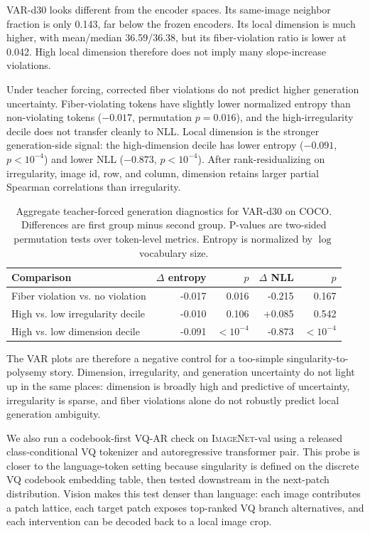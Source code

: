 \documentclass{article}
\newcommand{\dataset}[1]{\textsc{#1}}
\begin{document}
VAR-d30 looks different from the encoder spaces. Its same-image neighbor fraction is only 0.143, far below the frozen encoders. Its local dimension is much higher, with mean/median 36.59/36.38, but its fiber-violation ratio is lower at 0.042. High local dimension therefore does not imply many slope-increase violations.

Under teacher forcing, corrected fiber violations do not predict higher generation uncertainty. Fiber-violating tokens have slightly lower normalized entropy than non-violating tokens ($-0.017$, permutation $p=0.016$), and the high-irregularity decile does not transfer cleanly to NLL. Local dimension is the stronger generation-side signal: the high-dimension decile has lower entropy ($-0.091$, $p<10^{-4}$) and lower NLL ($-0.873$, $p<10^{-4}$). After rank-residualizing on irregularity, image id, row, and column, dimension retains larger partial Spearman correlations than irregularity.

\begin{table}[H]
\centering
\scriptsize
\caption{Aggregate teacher-forced generation diagnostics for VAR-d30 on \dataset{COCO}. Differences are first group minus second group. P-values are two-sided permutation tests over token-level metrics. Entropy is normalized by $\log$ vocabulary size.}
\begin{tabular}{@{}lrrrr@{}}
\toprule
Comparison & $\Delta$ entropy & $p$ & $\Delta$ NLL & $p$ \\
\midrule
Fiber violation vs. no violation & -0.017 & 0.016 & -0.215 & 0.167 \\
High vs. low irregularity decile & -0.010 & 0.106 & +0.085 & 0.542 \\
High vs. low dimension decile & -0.091 & $<10^{-4}$ & -0.873 & $<10^{-4}$ \\
\bottomrule
\end{tabular}
\label{tab:coco-var-generation}
\end{table}

The VAR plots are therefore a negative control for a too-simple singularity-to-polysemy story. Dimension, irregularity, and generation uncertainty do not light up in the same places: dimension is broadly high and predictive of uncertainty, irregularity is sparse, and fiber violations alone do not robustly predict local generation ambiguity.

We also run a codebook-first VQ-AR check on \dataset{ImageNet}-val using a released class-conditional VQ tokenizer and autoregressive transformer pair. This probe is closer to the language-token setting because singularity is defined on the discrete VQ codebook embedding table, then tested downstream in the next-patch distribution. Vision makes this test denser than language: each image contributes a patch lattice, each target patch exposes top-ranked VQ branch alternatives, and each intervention can be decoded back to a local image crop.
\end{document}
